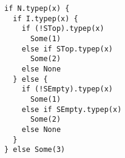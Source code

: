 \begin{lstlisting}[style=scalaioScala]
if N.typep(x) {
  if I.typep(x) {
    if (!STop).typep(x)
      Some(1)
    else if STop.typep(x)
      Some(2)
    else None
  } else {
    if (!SEmpty).typep(x)
      Some(1)
    else if SEmpty.typep(x)
      Some(2)
    else None
  }
} else Some(3)
\end{lstlisting}
